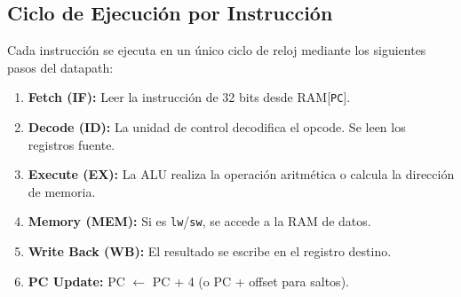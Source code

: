 \subsection{Ciclo de Ejecución por Instrucción}

Cada instrucción se ejecuta en un único ciclo de reloj mediante los siguientes pasos del datapath:

\begin{enumerate}
    \item \textbf{Fetch (IF):} Leer la instrucción de 32 bits desde RAM[\texttt{PC}].
    \item \textbf{Decode (ID):} La unidad de control decodifica el opcode. Se leen los registros fuente.
    \item \textbf{Execute (EX):} La ALU realiza la operación aritmética o calcula la dirección de memoria.
    \item \textbf{Memory (MEM):} Si es \texttt{lw}/\texttt{sw}, se accede a la RAM de datos.
    \item \textbf{Write Back (WB):} El resultado se escribe en el registro destino.
    \item \textbf{PC Update:} PC $\leftarrow$ PC + 4 (o PC + offset para saltos).
\end{enumerate}
